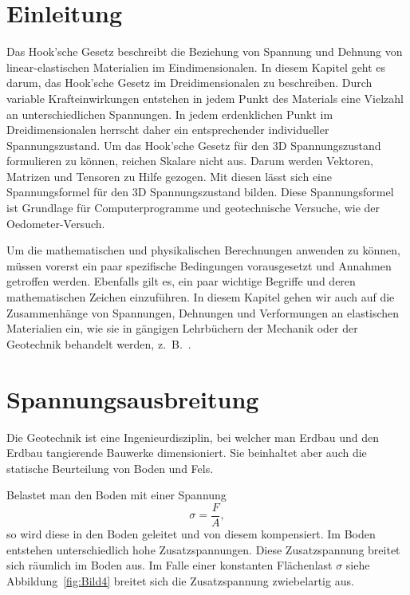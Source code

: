 \section{Einleitung\label{spannung:section:Einleitung}}
Das Hook'sche Gesetz beschreibt die Beziehung von Spannung und Dehnung von linear-elastischen Materialien im Eindimensionalen.
In diesem Kapitel geht es darum, das Hook'sche Gesetz im Dreidimensionalen zu beschreiben.
Durch variable Krafteinwirkungen entstehen in jedem Punkt des Materials eine Vielzahl an unterschiedlichen Spannungen.
In jedem erdenklichen Punkt im Dreidimensionalen herrscht daher ein entsprechender individueller Spannungszustand.
Um das Hook'sche Gesetz für den 3D Spannungszustand formulieren zu können, reichen Skalare nicht aus.
Darum werden Vektoren, Matrizen und Tensoren zu Hilfe gezogen.
Mit diesen lässt sich eine Spannungsformel für den 3D Spannungszustand bilden.
Diese Spannungsformel ist Grundlage für Computerprogramme und geotechnische Versuche, wie der Oedometer-Versuch.

Um die mathematischen und physikalischen Berechnungen anwenden zu können,
müssen vorerst ein paar spezifische Bedingungen vorausgesetzt und Annahmen getroffen werden.
Ebenfalls gilt es, ein paar wichtige Begriffe und deren mathematischen Zeichen einzuführen.
In diesem Kapitel gehen wir auch auf die Zusammenhänge von Spannungen, Dehnungen und Verformungen an elastischen Materialien ein,
wie sie in gängigen Lehrbüchern der Mechanik oder der Geotechnik behandelt werden, z.~B.~\cite{spannung:Grundlagen-der-Geotechnik}.

\section{Spannungsausbreitung\label{spannung:section:Spannungsausbreitung}}
Die Geotechnik ist eine Ingenieurdisziplin, bei welcher man Erdbau und den Erdbau tangierende Bauwerke dimensioniert.
Sie beinhaltet aber auch die statische Beurteilung von Boden und Fels.

Belastet man den Boden mit einer Spannung
\[
\sigma
=
\frac{F}{A}
,
\]
so wird diese in den Boden geleitet und von diesem kompensiert.
Im Boden entstehen unterschiedlich hohe Zusatzspannungen.
Diese Zusatzspannung breitet sich räumlich im Boden aus.
Im Falle einer konstanten Flächenlast $\sigma$ siehe Abbildung~\ref{fig:Bild4} breitet sich die Zusatzspannung zwiebelartig aus.

